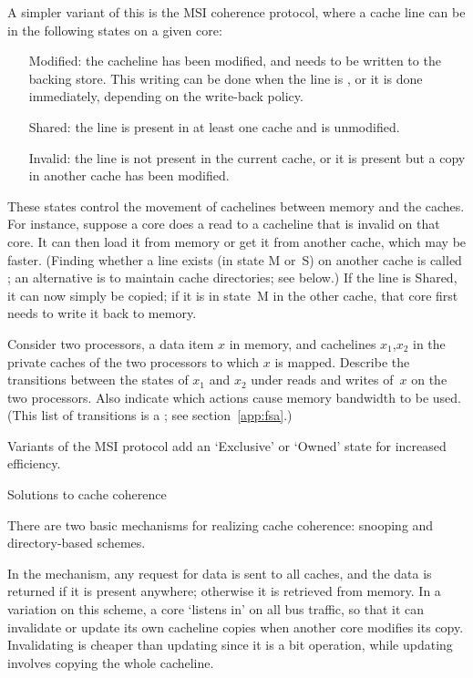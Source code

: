 A simpler variant of this is the \acf{MSI} coherence protocol, where a
cache line can be in the following states on a given core:
\begin{itemize}
\item [Modified:] the cacheline has been modified, and needs to be
  written to the backing store. This writing can be done when the line
  is , or it is done immediately, depending on the
  write-back policy.
\item [Shared:] the line is present in at least one cache and is unmodified.
\item [Invalid:] the line is not present in the current cache, or it
  is present but a copy in another cache has been modified.
\end{itemize}

These states control the movement of cachelines between memory and the
caches. For instance, suppose a core does a read to a cacheline that
is invalid on that core. It can then load it from memory or get it
from another cache, which may be faster. (Finding whether a line exists
(in state M or~S) on another cache is called ; an alternative
is to maintain cache directories; see below.) If
the line is Shared, it can now simply be copied; if it is in state~M in
the other cache, that core first needs to write it back to memory.

\begin{exercise}
  Consider two processors, a data item $x$ in memory, and cachelines
  $x_1$,$x_2$ in the private caches of the two processors to which $x$
  is mapped. Describe the transitions between the states of $x_1$ and
  $x_2$ under reads and writes of~$x$ on the two processors. Also
  indicate which actions cause memory bandwidth to be used. (This list
  of transitions is a ; see section~\ref{app:fsa}.)
\end{exercise}

Variants of the \ac{MSI} protocol add an `Exclusive' or `Owned' state
for increased efficiency.

 {Solutions to cache coherence}

There are two basic  mechanisms for realizing cache coherence:
snooping and directory-based schemes.

In the  mechanism, any request for data is sent
to all caches, and the data is returned if it is present anywhere;
otherwise it is retrieved from memory. In a variation on this scheme,
a core 
`listens in' on all bus traffic, so that it can invalidate or update its own cacheline 
copies when another core modifies its copy. Invalidating is cheaper than updating
since it is a bit operation, while updating involves copying the whole cacheline.

